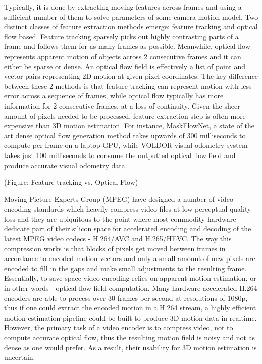 \documentclass[11pt,english]{report}
\begin{document}
Typically, it is done by extracting moving features across frames and using a sufficient number of them to solve parameters of some camera motion model. Two distinct classes of feature extraction methods emerge: feature tracking and optical flow based. Feature tracking sparsely picks out highly contrasting parts of a frame and follows them for as many frames as possible. Meanwhile, optical flow represents apparent motion of objects across 2 consecutive frames and it can either be sparse or dense. An optical flow field is effectively a list of point and vector pairs representing 2D motion at given pixel coordinates. The key difference between these 2 methods is that feature tracking can represent motion with less error across a sequence of frames, while optical flow typically has more information for 2 consecutive frames, at a loss of continuity. Given the sheer amount of pixels needed to be processed, feature extraction step is often more expensive than 3D motion estimation. For instance, MaskFlowNet\cite{zhao2020maskflownet}, a state of the art dense optical flow generation method takes upwards of 300 milliseconds to compute per frame on a laptop GPU, while VOLDOR\cite{voldor} visual odometry system takes just 100 milliseconds to consume the outputted optical flow field and produce accurate visual odometry data.

(Figure: Feature tracking vs. Optical Flow)

Moving Picture Experts Group (MPEG) have designed a number of video encoding standards which heavily compress video files at low perceptual quality loss and they are ubiquitous to the point where most commodity hardware dedicate part of their silicon space for accelerated encoding and decoding of the latest MPEG video codecs - H.264/AVC\cite{h264} and H.265/HEVC\cite{h265}. The way this compression works is that blocks of pixels get moved between frames in accordance to encoded motion vectors and only a small amount of new pixels are encoded to fill in the gaps and make small adjustments to the resulting frame. Essentially, to save space video encoding relies on apparent motion estimation, or in other words - optical flow field computation. Many hardware accelerated H.264 encoders are able to process over 30 frames per second at resolutions of 1080p, thus if one could extract the encoded motion in a H.264 stream, a highly efficient motion estimation pipeline could be built to produce 3D motion data in realtime. However, the primary task of a video encoder is to compress video, not to compute accurate optical flow, thus the resulting motion field is noisy\cite{1334181} and not as dense as one would prefer. As a result, their usability for 3D motion estimation is uncertain.
\end{document}
